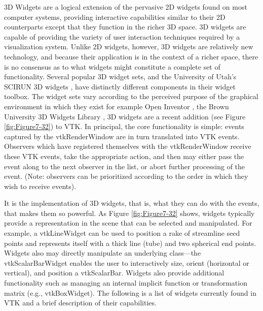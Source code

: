 \gls{3D Widget}s are a logical extension of the pervasive 2D widgets found on most computer systems, providing interactive capabilities similar to their 2D counterparts except that they function in the richer 3D space. 3D widgets are capable of providing the variety of user interaction techniques required by a visualization system. Unlike 2D widgets, however, 3D widgets are relatively new technology, and because their application is in the context of a richer space, there is no consensus as to what widgets might constitute a complete set of functionality. Several popular 3D widget sets, and the University of Utah's SCIRUN 3D widgets \cite{Purciful95}, have distinctly different components in their widget toolbox. The widget sets vary according to the perceived purpose of the graphical environment in which they exist for example Open Inventor \cite{Wernecke94}, the Brown University 3D Widgets Library \cite{Zeleznik93},  3D widgets are a recent addition (see Figure \ref{fig:Figure7-32}) to VTK. In principal, the core functionality is simple: events captured by the vtkRenderWindow are in turn translated into VTK events. Observers which have registered themselves with the vtkRenderWindow receive these VTK events, take the appropriate action, and then may either pass the event along to the next observer in the list, or abort further processing of the event. (Note: observers can be prioritized according to the order in which they wish to receive events).

It is the implementation of 3D widgets, that is, what they can do with the events, that makes them so powerful. As Figure \ref{fig:Figure7-32} shows, widgets typically provide a representation in the scene that can be selected and manipulated. For example, a vtkLineWidget can be used to position a rake of streamline seed points and represents itself with a thick line (tube) and two spherical end points. Widgets also may directly manipulate an underlying class---the vtkScalarBarWidget enables the user to interactively size, orient (horizontal or vertical), and position a vtkScalarBar. Widgets also provide additional functionality such as managing an internal implicit function or transformation matrix (e.g., vtkBoxWidget). The following is a list of widgets currently found in VTK and a brief description of their capabilities.

